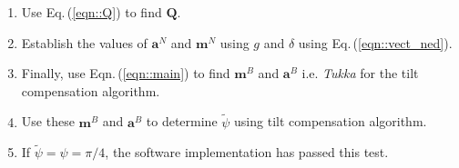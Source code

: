 \documentclass[12pt]{article}
\begin{document}
\begin{enumerate}
    \item Use Eq.\,(\ref{eqn::Q}) to find $\bm{Q}$.
    \item Establish the values of $\bm{a}^{N}$ and $\bm{m}^{N}$ using $g$ and $\delta$ using Eq.\,(\ref{eqn::vect_ned}).
    \item Finally, use Eqn.\,(\ref{eqn::main}) to find $\bm{m}^{B}$ and $\bm{a}^{B}$ i.e. \textit{Tukka} for the tilt compensation algorithm.
    \item Use these $\bm{m}^{B}$ and $\bm{a}^{B}$ to determine $\tilde{\psi}$ using tilt compensation algorithm.
    \item If $\tilde{\psi}=\psi=\pi/4$, the software implementation has passed this test.
\end{enumerate}
\end{document}

